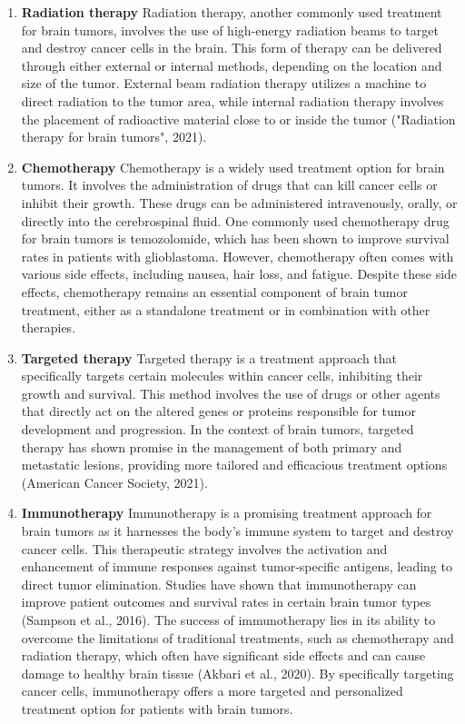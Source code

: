 \documentclass[12pt,oneside]{report}
\begin{document}
\begin{enumerate}
\begin{enumerate}
\end{enumerate}

\item \textbf{ Radiation therapy}
Radiation therapy, another commonly used treatment for brain tumors, involves the use of high-energy radiation beams to target and destroy cancer cells in the brain. This form of therapy can be delivered through either external or internal methods, depending on the location and size of the tumor. External beam radiation therapy utilizes a machine to direct radiation to the tumor area, while internal radiation therapy involves the placement of radioactive material close to or inside the tumor ("Radiation therapy for brain tumors", 2021).

\item \textbf{Chemotherapy}
Chemotherapy is a widely used treatment option for brain tumors. It involves the administration of drugs that can kill cancer cells or inhibit their growth. These drugs can be administered intravenously, orally, or directly into the cerebrospinal fluid. One commonly used chemotherapy drug for brain tumors is temozolomide, which has been shown to improve survival rates in patients with glioblastoma. However, chemotherapy often comes with various side effects, including nausea, hair loss, and fatigue. Despite these side effects, chemotherapy remains an essential component of brain tumor treatment, either as a standalone treatment or in combination with other therapies.

\item \textbf{Targeted therapy}
Targeted therapy is a treatment approach that specifically targets certain molecules within cancer cells, inhibiting their growth and survival. This method involves the use of drugs or other agents that directly act on the altered genes or proteins responsible for tumor development and progression. In the context of brain tumors, targeted therapy has shown promise in the management of both primary and metastatic lesions, providing more tailored and efficacious treatment options (American Cancer Society, 2021).

\item \textbf{Immunotherapy}
Immunotherapy is a promising treatment approach for brain tumors as it harnesses the body's immune system to target and destroy cancer cells. This therapeutic strategy involves the activation and enhancement of immune responses against tumor-specific antigens, leading to direct tumor elimination. Studies have shown that immunotherapy can improve patient outcomes and survival rates in certain brain tumor types (Sampson et al., 2016). The success of immunotherapy lies in its ability to overcome the limitations of traditional treatments, such as chemotherapy and radiation therapy, which often have significant side effects and can cause damage to healthy brain tissue (Akbari et al., 2020). By specifically targeting cancer cells, immunotherapy offers a more targeted and personalized treatment option for patients with brain tumors.

\end{enumerate}
\end{document}
